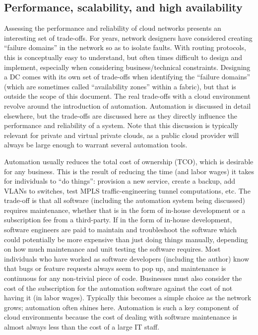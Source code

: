 \subsection{Performance, scalability, and high availability}
Assessing the performance and reliability of cloud networks presents an
interesting set of trade-offs. For years, network designers have considered
creating ``failure domains'' in the network so as to isolate faults. With
routing protocols, this is conceptually easy to understand, but often times
difficult to design and implement, especially when considering
business/technical constraints. Designing a DC comes with its own set of
trade-offs when identifying the ``failure domains'' (which are sometimes called
``availability zones'' within a fabric), but that is outside the scope of this
document. The real trade-offs with a cloud environment revolve around the
introduction of automation. Automation is discussed in detail elsewhere,
but the trade-offs are discussed here as they directly influence the
performance and reliability of a system. Note that this discussion is
typically relevant for private and virtual private clouds, as a public cloud
provider will always be large enough to warrant several automation tools.

Automation usually reduces the total cost of ownership (TCO), which is
desirable for any business. This is the result of reducing the time (and labor
wages) it takes for individuals to ``do things'': provision a new service,
create a backup, add VLANs to switches, test MPLS traffic-engineering tunnel
computations, etc. The trade-off is that all software (including the
automation system being discussed) requires maintenance, whether that is in
the form of in-house development or a subscription fee from a third-party. If
in the form of in-house development, software engineers are paid to maintain
and troubleshoot the software which could potentially be more expensive than
just doing things manually, depending on how much maintenance and unit testing
the software requires. Most individuals who have worked as software developers
(including the author) know that bugs or feature requests always seem to pop
up, and maintenance is continuous for any non-trivial piece of code.
Businesses must also consider the cost of the subscription for the automation
software against the cost of not having it (in labor wages). Typically this
becomes a simple choice as the network grows; automation often shines here.
Automation is such a key component of cloud environments because the cost of
dealing with software maintenance is almost always less than the cost of a
large IT staff.

